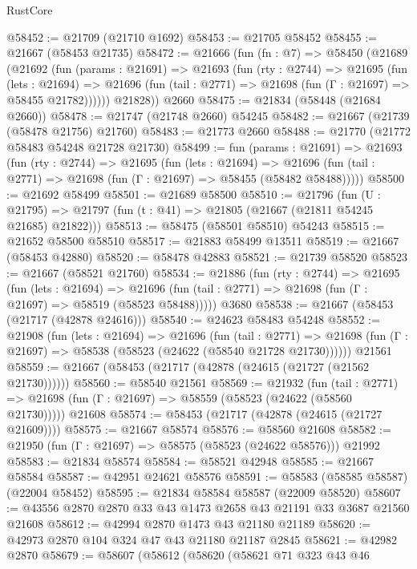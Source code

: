 \begin{lexlean}{RustCore}
\begin{coremodule}
@58452 := @21709 (@21710 @1692)
@58453 := @21705 @58452
@58455 := @21667 (@58453 @21735)
@58472 := @21666
    (fun (fn : @7) =>
    @58450
      (@21689
        (@21692
          (fun (params : @21691) =>
          @21693
            (fun (rty : @2744) =>
            @21695
              (fun (lets : @21694) =>
              @21696 (fun (tail : @2771) => @21698 (fun (Γ : @21697) => @58455 @21782))))))
        @21828))
    @2660
@58475 := @21834 (@58448 (@21684 @2660))
@58478 := @21747 (@21748 @2660) @54245
@58482 := @21667 (@21739 (@58478 @21756) @21760)
@58483 := @21773 @2660
@58488 := @21770 (@21772 @58483 @54248 @21728 @21730)
@58499 := fun (params : @21691) =>
  @21693
    (fun (rty : @2744) =>
    @21695
      (fun (lets : @21694) =>
      @21696 (fun (tail : @2771) => @21698 (fun (Γ : @21697) => @58455 (@58482 @58488)))))
@58500 := @21692 @58499
@58501 := @21689 @58500
@58510 := @21796
    (fun (U : @21795) => @21797 (fun (t : @41) => @21805 (@21667 (@21811 @54245 @21685) @21822)))
@58513 := @58475 (@58501 @58510) @54243
@58515 := @21652 @58500 @58510
@58517 := @21883 @58499 @13511
@58519 := @21667 (@58453 @42880)
@58520 := @58478 @42883
@58521 := @21739 @58520
@58523 := @21667 (@58521 @21760)
@58534 := @21886
    (fun (rty : @2744) =>
    @21695
      (fun (lets : @21694) =>
      @21696 (fun (tail : @2771) => @21698 (fun (Γ : @21697) => @58519 (@58523 @58488)))))
    @3680
@58538 := @21667 (@58453 (@21717 (@42878 @24616)))
@58540 := @24623 @58483 @54248
@58552 := @21908
    (fun (lets : @21694) =>
    @21696
      (fun (tail : @2771) =>
      @21698 (fun (Γ : @21697) => @58538 (@58523 (@24622 (@58540 @21728 @21730))))))
    @21561
@58559 := @21667 (@58453 (@21717 (@42878 (@24615 (@21727 (@21562 @21730))))))
@58560 := @58540 @21561
@58569 := @21932
    (fun (tail : @2771) => @21698 (fun (Γ : @21697) => @58559 (@58523 (@24622 (@58560 @21730)))))
    @21608
@58574 := @58453 (@21717 (@42878 (@24615 (@21727 @21609))))
@58575 := @21667 @58574
@58576 := @58560 @21608
@58582 := @21950 (fun (Γ : @21697) => @58575 (@58523 (@24622 @58576))) @21992
@58583 := @21834 @58574
@58584 := @58521 @42948
@58585 := @21667 @58584
@58587 := @42951 @24621 @58576
@58591 := @58583 (@58585 @58587) (@22004 @58452)
@58595 := @21834 @58584 @58587 (@22009 @58520)
@58607 := @43556 @2870 @2870 @33 @43 @1473 @2658 @43 @21191 @33 @3687 @21560 @21608
@58612 := @42994 @2870 @1473 @43 @21180 @21189
@58620 := @42973 @2870 @104 @324 @47 @43 @21180 @21187 @2845
@58621 := @42982 @2870
@58679 := @58607
    (@58612
      (@58620
        (@58621
          @71
          @323
          @43
          @46

\end{coremodule}
\end{lexlean}
